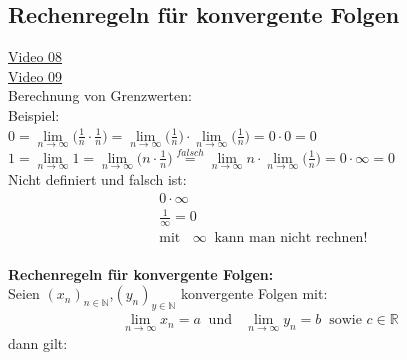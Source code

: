 \subsection{Rechenregeln für konvergente Folgen}
\href{https://youtu.be/m6GeFKpvFQ8}{Video 08}\\
\href{https://youtu.be/wWXpWP5EGCU}{Video 09}\\
Berechnung von Grenzwerten:\\
Beispiel:\\
\textbullet \;\; $ 0=\lim\limits_ {n\to\infty}\bigg(\frac{1}{n}\cdot \frac{1}{n}\bigg)=\lim\limits_ {n\to\infty}\bigg(\frac{1}{n}\bigg)\cdot\lim\limits_ {n\to\infty}\bigg(\frac{1}{n}\bigg)=0\cdot 0=0 $\\
\textbullet \;\; $ 1=\lim\limits_ {n\to\infty}1 =\lim\limits_ {n\to\infty}\bigg(n\cdot \frac{1}{n}\bigg)\overset{falsch}{=}\lim\limits_ {n\to\infty} n\cdot \lim\limits_ {n\to\infty}\bigg(\frac{1}{n}\bigg)=0\cdot\infty=0 $ \vspace*{4mm}\\
Nicht definiert und falsch ist:\\
\begin{align*}
&0\cdot\infty\\
&\frac{1}{\infty}=0\\
&\text{mit }\;\;\infty\;\; \text{kann man nicht rechnen! }
\end{align*}\vspace*{2mm}\\
\textbf{Rechenregeln für konvergente Folgen:}\\
Seien $ (x_n)_{n\in\mathbb{N}} $,$ (y_n)_{y\in \mathbb{N}} $ konvergente Folgen mit:\\
\begin{align*}
\lim\limits_ {n\to\infty}x_n=a \;\;\text{und }\;\; \lim\limits_ {n\to\infty}y_n=b\;\;\text{sowie }c\in \mathbb{R}
\end{align*}
dann gilt:\\
\begin{center}
	
\end{center}
